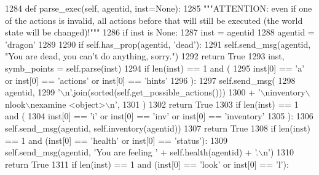 \begin{DoxyCode}
1284     \textcolor{keyword}{def }parse\_exec(self, agentid, inst=None):
1285         \textcolor{stringliteral}{"""ATTENTION: even if one of the actions is invalid, all actions before that will still be executed
       (the world state will be changed)!"""}
1286         \textcolor{keywordflow}{if} inst \textcolor{keywordflow}{is} \textcolor{keywordtype}{None}:
1287             inst = agentid
1288             agentid = \textcolor{stringliteral}{'dragon'}
1289 
1290         \textcolor{keywordflow}{if} self.has\_prop(agentid, \textcolor{stringliteral}{'dead'}):
1291             self.send\_msg(agentid, \textcolor{stringliteral}{"You are dead, you can't do anything, sorry."})
1292             \textcolor{keywordflow}{return} \textcolor{keyword}{True}
1293         inst, symb\_points = self.parse(inst)
1294         \textcolor{keywordflow}{if} len(inst) == 1 \textcolor{keywordflow}{and} (
1295             inst[0] == \textcolor{stringliteral}{'a'} \textcolor{keywordflow}{or} inst[0] == \textcolor{stringliteral}{'actions'} \textcolor{keywordflow}{or} inst[0] == \textcolor{stringliteral}{'hints'}
1296         ):
1297             self.send\_msg(
1298                 agentid,
1299                 \textcolor{stringliteral}{'\(\backslash\)n'}.join(sorted(self.get\_possible\_actions()))
1300                 + \textcolor{stringliteral}{'\(\backslash\)ninventory\(\backslash\)nlook\(\backslash\)nexamine <object>\(\backslash\)n'},
1301             )
1302             \textcolor{keywordflow}{return} \textcolor{keyword}{True}
1303         \textcolor{keywordflow}{if} len(inst) == 1 \textcolor{keywordflow}{and} (
1304             inst[0] == \textcolor{stringliteral}{'i'} \textcolor{keywordflow}{or} inst[0] == \textcolor{stringliteral}{'inv'} \textcolor{keywordflow}{or} inst[0] == \textcolor{stringliteral}{'inventory'}
1305         ):
1306             self.send\_msg(agentid, self.inventory(agentid))
1307             \textcolor{keywordflow}{return} \textcolor{keyword}{True}
1308         \textcolor{keywordflow}{if} len(inst) == 1 \textcolor{keywordflow}{and} (inst[0] == \textcolor{stringliteral}{'health'} \textcolor{keywordflow}{or} inst[0] == \textcolor{stringliteral}{'status'}):
1309             self.send\_msg(agentid, \textcolor{stringliteral}{'You are feeling '} + self.health(agentid) + \textcolor{stringliteral}{'.\(\backslash\)n'})
1310             \textcolor{keywordflow}{return} \textcolor{keyword}{True}
1311         \textcolor{keywordflow}{if} len(inst) == 1 \textcolor{keywordflow}{and} (inst[0] == \textcolor{stringliteral}{'look'} \textcolor{keywordflow}{or} inst[0] == \textcolor{stringliteral}{'l'}):

\end{DoxyCode}
